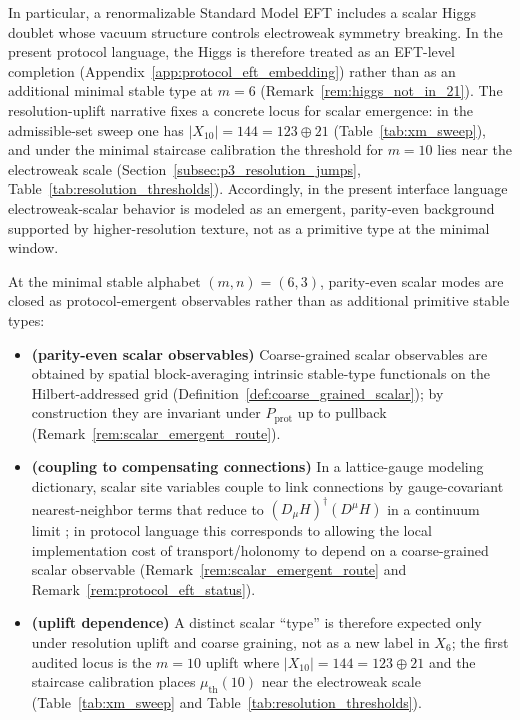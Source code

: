 In particular, a renormalizable Standard Model EFT includes a scalar Higgs doublet whose vacuum structure controls electroweak symmetry breaking.
In the present protocol language, the Higgs is therefore treated as an EFT-level completion (Appendix~\ref{app:protocol_eft_embedding}) rather than as an additional minimal stable type at $m=6$ (Remark~\ref{rem:higgs_not_in_21}).
The resolution-uplift narrative fixes a concrete locus for scalar emergence:
in the admissible-set sweep one has $|X_{10}|=144=123\oplus 21$ (Table~\ref{tab:xm_sweep}), and under the minimal staircase calibration the threshold for $m=10$ lies near the electroweak scale (Section~\ref{subsec:p3_resolution_jumps}, Table~\ref{tab:resolution_thresholds}).
Accordingly, in the present interface language electroweak-scalar behavior is modeled as an emergent, parity-even background supported by higher-resolution texture, not as a primitive type at the minimal window.

\begin{proposition}\label{prop:scalar_sector_closed}
At the minimal stable alphabet $(m,n)=(6,3)$, parity-even scalar modes are closed as protocol-emergent observables rather than as additional primitive stable types:
\begin{itemize}
\item \textbf{(parity-even scalar observables)} Coarse-grained scalar observables are obtained by spatial block-averaging intrinsic stable-type functionals on the Hilbert-addressed grid (Definition~\ref{def:coarse_grained_scalar}); by construction they are invariant under $P_{\mathrm{prot}}$ up to pullback (Remark~\ref{rem:scalar_emergent_route}).
\item \textbf{(coupling to compensating connections)} In a lattice-gauge modeling dictionary, scalar site variables couple to link connections by gauge-covariant nearest-neighbor terms that reduce to $(D_\mu H)^\dagger(D^\mu H)$ in a continuum limit \cite{Wilson1974,KogutSusskind1975HamiltonianLGT,Rothe2012}; in protocol language this corresponds to allowing the local implementation cost of transport/holonomy to depend on a coarse-grained scalar observable (Remark~\ref{rem:scalar_emergent_route} and Remark~\ref{rem:protocol_eft_status}).
\item \textbf{(uplift dependence)} A distinct scalar ``type'' is therefore expected only under resolution uplift and coarse graining, not as a new label in $X_6$; the first audited locus is the $m=10$ uplift where $|X_{10}|=144=123\oplus 21$ and the staircase calibration places $\mu_{\mathrm{th}}(10)$ near the electroweak scale (Table~\ref{tab:xm_sweep} and Table~\ref{tab:resolution_thresholds}).
\end{itemize}
\end{proposition}

